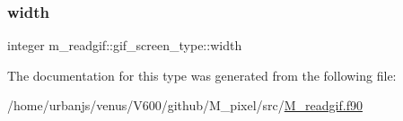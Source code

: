 \subsubsection{\texorpdfstring{width}{width}}
{\footnotesize\ttfamily integer m\+\_\+readgif\+::gif\+\_\+screen\+\_\+type\+::width}



The documentation for this type was generated from the following file\+:\begin{DoxyCompactItemize}
\item 
/home/urbanjs/venus/\+V600/github/\+M\+\_\+pixel/src/\mbox{\hyperlink{M__readgif_8f90}{M\+\_\+readgif.\+f90}}\end{DoxyCompactItemize}
